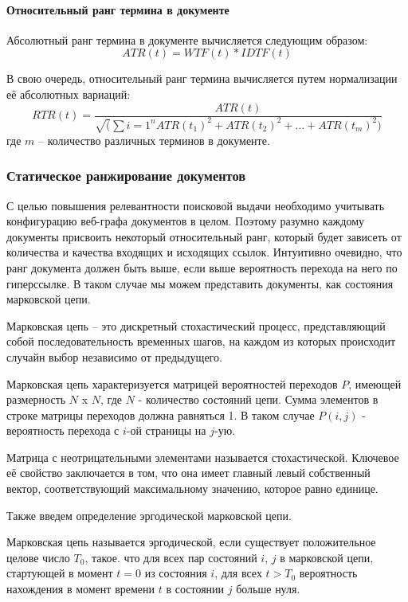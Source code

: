 \paragraph{Относительный ранг термина в документе}

Абсолютный ранг термина в документе вычисляется следующим образом:
\begin{equation}
ATR(t) = WTF(t) * IDTF(t)
\end{equation}

В свою очередь, относительный ранг термина вычисляется путем нормализации её абсолютных вариаций:
\begin{equation}
RTR(t) = \frac{ATR(t)}{\sqrt(\sum{i = 1}^{n}ATR(t_1)^2 + ATR(t_2)^2 + ... + ATR(t_m)^2)}
\end{equation} где $m$ -- количество различных терминов в документе.

\subsubsection{Статическое ранжирование документов}

С целью повышения релевантности поисковой выдачи необходимо учитывать конфигурацию веб-графа документов в целом. Поэтому разумно каждому документы присвоить некоторый относительный ранг, который будет зависеть от количества и качества входящих и исходящих ссылок. Интуитивно очевидно, что ранг документа должен быть выше, если выше вероятность перехода на него по гиперссылке. В таком случае мы можем представить документы, как состояния марковской цепи. 

Марковская цепь -- это дискретный стохастический процесс, представляющий собой последовательность временных шагов, на каждом из которых происходит случайн выбор независимо от предыдущего.

Марковская цепь характеризуется матрицей вероятностей переходов $P$, имеющей размерность $N$ x $N$, где $N$ - количество состояний цепи. Сумма элементов в строке матрицы переходов должна равняться 1. В таком случае $P(i, j)$ - вероятность перехода с $i$-ой страницы на $j$-ую.

Матрица с неотрицательными элементами называется стохастической. Ключевое её свойство заключается в том, что она имеет главный левый собственный вектор, соответствующий максимальному значению, которое равно единице.

Также введем определение эргодической марковской цепи.

Марковская цепь называется эргодической, если существует положительное целове число $T_0$, такое. что для всех пар состояний $i$, $j$ в марковской цепи, стартующей в момент $t = 0$ из состояния $i$, для всех $t > T_0$ вероятность нахождения в момент времени $t$ в состоянии $j$ больше нуля.

